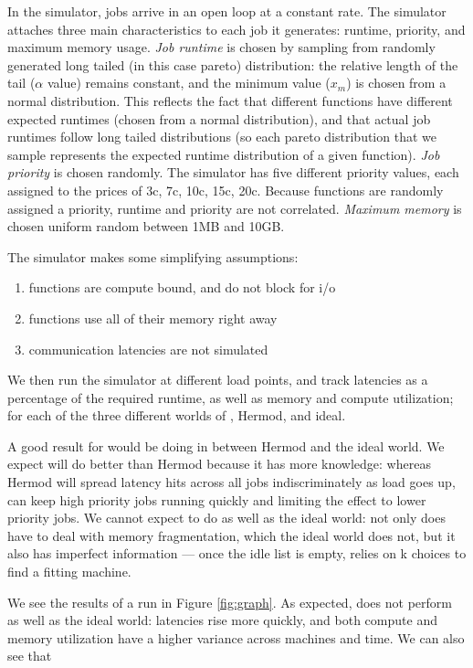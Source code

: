In the simulator, jobs arrive in an open loop at a constant rate. The simulator
attaches three main characteristics to each job it generates: runtime, priority,
and maximum memory usage. \textit{Job runtime} is chosen by sampling from
randomly generated long tailed (in this case pareto) distribution: the relative
length of the tail ($\alpha$ value) remains constant, and the minimum value
($x_m$) is chosen from a normal distribution. This reflects the fact that
different functions have different expected runtimes (chosen from a normal
distribution), and that actual job runtimes follow long tailed distributions (so
each pareto distribution that we sample represents the expected runtime
distribution of a given function). \textit{Job priority} is chosen randomly. The
simulator has five different priority values, each assigned to the prices of 3c,
7c, 10c, 15c, 20c.
Because functions are randomly assigned a priority, runtime and priority are not
correlated. \textit{Maximum memory} is chosen uniform random between 1MB and
10GB. 

The simulator makes some simplifying assumptions:
\begin{enumerate}
    \item functions are compute bound, and do not block for i/o
    \item functions use all of their memory right away
    \item communication latencies are not simulated
\end{enumerate}


We then run the simulator at different load points, and track latencies as a
percentage of the required runtime, as well as memory and compute utilization;
for each of the three different worlds of \sys{}, Hermod, and ideal.

A good result for \sys{} would be doing in between Hermod and the ideal world.
We expect \sys{} will do better than Hermod because it has more knowledge:
whereas Hermod will spread latency hits across all jobs indiscriminately as load
goes up, \sys{} can keep high priority jobs running quickly and limiting the
effect to lower priority jobs. We cannot expect \sys{} to do as well as the
ideal world: not only does \sys{} have to deal with memory fragmentation, which
the ideal world does not, but it also has imperfect information --- once the
idle list is empty, \sys{} relies on k choices to find a fitting machine. 

We see the results of a run in Figure \ref{fig:graph}. As expected, \sys{} does
not perform as well as the ideal world: latencies rise more quickly, and both
compute and memory utilization have a higher variance across machines and time.
We can also see that 


